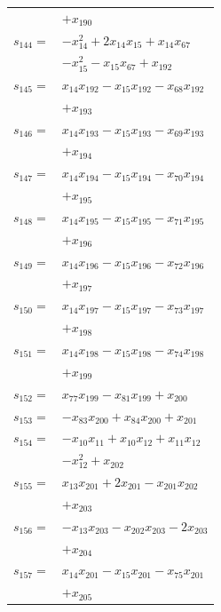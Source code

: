 \begin{longtable}{@{}r@{\;}l@{}}
 & \(\displaystyle +x_{190}\) \\[3pt]
\(s_{144}=\) & \(\displaystyle -x_{14}^{2} +2x_{14}x_{15} +x_{14}x_{67}\) \\
 & \(\displaystyle -x_{15}^{2} -x_{15}x_{67} +x_{192}\) \\[3pt]
\(s_{145}=\) & \(\displaystyle x_{14}x_{192} -x_{15}x_{192} -x_{68}x_{192}\) \\
 & \(\displaystyle +x_{193}\) \\[3pt]
\(s_{146}=\) & \(\displaystyle x_{14}x_{193} -x_{15}x_{193} -x_{69}x_{193}\) \\
 & \(\displaystyle +x_{194}\) \\[3pt]
\(s_{147}=\) & \(\displaystyle x_{14}x_{194} -x_{15}x_{194} -x_{70}x_{194}\) \\
 & \(\displaystyle +x_{195}\) \\[3pt]
\(s_{148}=\) & \(\displaystyle x_{14}x_{195} -x_{15}x_{195} -x_{71}x_{195}\) \\
 & \(\displaystyle +x_{196}\) \\[3pt]
\(s_{149}=\) & \(\displaystyle x_{14}x_{196} -x_{15}x_{196} -x_{72}x_{196}\) \\
 & \(\displaystyle +x_{197}\) \\[3pt]
\(s_{150}=\) & \(\displaystyle x_{14}x_{197} -x_{15}x_{197} -x_{73}x_{197}\) \\
 & \(\displaystyle +x_{198}\) \\[3pt]
\(s_{151}=\) & \(\displaystyle x_{14}x_{198} -x_{15}x_{198} -x_{74}x_{198}\) \\
 & \(\displaystyle +x_{199}\) \\[3pt]
\(s_{152}=\) & \(\displaystyle x_{77}x_{199} -x_{81}x_{199} +x_{200}\) \\[3pt]
\(s_{153}=\) & \(\displaystyle -x_{83}x_{200} +x_{84}x_{200} +x_{201}\) \\[3pt]
\(s_{154}=\) & \(\displaystyle -x_{10}x_{11} +x_{10}x_{12} +x_{11}x_{12}\) \\
 & \(\displaystyle -x_{12}^{2} +x_{202}\) \\[3pt]
\(s_{155}=\) & \(\displaystyle x_{13}x_{201} +2x_{201} -x_{201}x_{202}\) \\
 & \(\displaystyle +x_{203}\) \\[3pt]
\(s_{156}=\) & \(\displaystyle -x_{13}x_{203} -x_{202}x_{203} -2x_{203}\) \\
 & \(\displaystyle +x_{204}\) \\[3pt]
\(s_{157}=\) & \(\displaystyle x_{14}x_{201} -x_{15}x_{201} -x_{75}x_{201}\) \\
 & \(\displaystyle +x_{205}\) \\[3pt]
\end{longtable}
\endgroup
